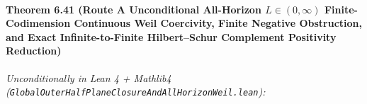 \documentclass[
  11pt,
]{article}
\begin{document}
\paragraph{\texorpdfstring{Theorem 6.41 (Route A Unconditional
All-Horizon \(L \in (0, \infty)\) Finite-Codimension Continuous Weil
Coercivity, Finite Negative Obstruction, and Exact Infinite-to-Finite
Hilbert--Schur Complement Positivity
Reduction)}{Theorem 6.41 (Route A Unconditional All-Horizon L \textbackslash in (0, \textbackslash infty) Finite-Codimension Continuous Weil Coercivity, Finite Negative Obstruction, and Exact Infinite-to-Finite Hilbert--Schur Complement Positivity Reduction)}}\label{theorem-6.41-route-a-unconditional-all-horizon-l-in-0-infty-finite-codimension-continuous-weil-coercivity-finite-negative-obstruction-and-exact-infinite-to-finite-hilbertschur-complement-positivity-reduction}

\emph{Unconditionally in Lean 4 + Mathlib4
(\texttt{GlobalOuterHalfPlaneClosureAndAllHorizonWeil.lean}):}
\end{document}
